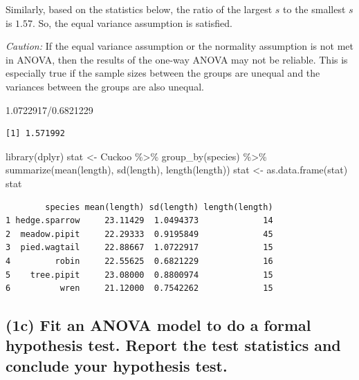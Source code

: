 \documentclass[
]{book}
\newenvironment{Shaded}{\begin{snugshade}}{\end{snugshade}}
\newcommand{\FloatTok}[1]{\textcolor[rgb]{0.00,0.00,0.81}{#1}}
\newcommand{\FunctionTok}[1]{\textcolor[rgb]{0.00,0.00,0.00}{#1}}
\newcommand{\NormalTok}[1]{#1}
\newcommand{\OtherTok}[1]{\textcolor[rgb]{0.56,0.35,0.01}{#1}}
\newcommand{\SpecialCharTok}[1]{\textcolor[rgb]{0.00,0.00,0.00}{#1}}
\begin{document}
Similarly, based on the statistics below, the ratio of the largest \(s\) to the smallest \(s\) is \(1.57\). So, the equal variance assumption is satisfied.

\emph{Caution:} If the equal variance assumption or the normality assumption is not met in ANOVA, then the results of the one-way ANOVA may not be reliable. This is especially true if the sample sizes between the groups are unequal and the variances between the groups are also unequal.

\begin{Shaded}
\begin{Highlighting}[]
\FloatTok{1.0722917}\SpecialCharTok{/}\FloatTok{0.6821229}
\end{Highlighting}
\end{Shaded}

\begin{verbatim}
[1] 1.571992
\end{verbatim}

\begin{Shaded}
\begin{Highlighting}[]
\FunctionTok{library}\NormalTok{(dplyr)}
\NormalTok{stat }\OtherTok{\textless{}{-}}\NormalTok{ Cuckoo }\SpecialCharTok{\%\textgreater{}\%} \FunctionTok{group\_by}\NormalTok{(species) }\SpecialCharTok{\%\textgreater{}\%} \FunctionTok{summarize}\NormalTok{(}\FunctionTok{mean}\NormalTok{(length), }\FunctionTok{sd}\NormalTok{(length), }\FunctionTok{length}\NormalTok{(length))}
\NormalTok{stat }\OtherTok{\textless{}{-}} \FunctionTok{as.data.frame}\NormalTok{(stat)}
\NormalTok{stat}
\end{Highlighting}
\end{Shaded}

\begin{verbatim}
        species mean(length) sd(length) length(length)
1 hedge.sparrow     23.11429  1.0494373             14
2  meadow.pipit     22.29333  0.9195849             45
3  pied.wagtail     22.88667  1.0722917             15
4         robin     22.55625  0.6821229             16
5    tree.pipit     23.08000  0.8800974             15
6          wren     21.12000  0.7542262             15
\end{verbatim}

\hypertarget{c-fit-an-anova-model-to-do-a-formal-hypothesis-test.-report-the-test-statistics-and-conclude-your-hypothesis-test.}{%
\subsection{(1c) Fit an ANOVA model to do a formal hypothesis test. Report the test statistics and conclude your hypothesis test.}\label{c-fit-an-anova-model-to-do-a-formal-hypothesis-test.-report-the-test-statistics-and-conclude-your-hypothesis-test.}}
\end{document}
